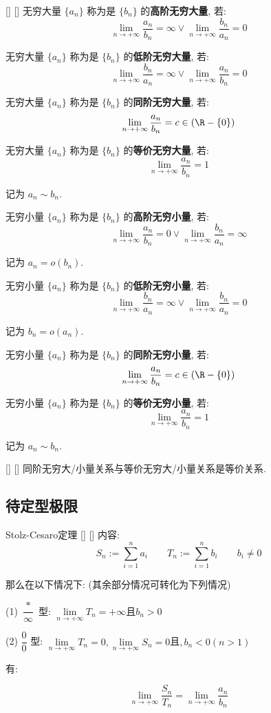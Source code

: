 \documentclass[UTF8]{ctexart}
\begin{document}
			\begin{dfn}
			    []
			    {}
			    []
			    []
				无穷大量 \(\{a_n\}\) 称为是 \(\{b_n\}\) 的\textbf{高阶无穷大量}, 若: 
				\[\lim_{n\to+\infty}\frac{a_n}{b_n}=\infty\vee\lim_{n\to+\infty}\frac{b_n}{a_n}=0\]
				
				无穷大量 \(\{a_n\}\) 称为是 \(\{b_n\}\) 的\textbf{低阶无穷大量}, 若: 
				\[\lim_{n\to+\infty}\frac{b_n}{a_n}=\infty\vee\lim_{n\to+\infty}\frac{a_n}{b_n}=0\]
			
				无穷大量 \(\{a_n\}\) 称为是 \(\{b_n\}\) 的\textbf{同阶无穷大量}, 若: 
				\[\lim_{n\to+\infty}\frac{a_n}{b_n}=c\in(\R-\{0\})\]
				
				无穷大量 \(\{a_n\}\) 称为是 \(\{b_n\}\) 的\textbf{等价无穷大量}, 若: \[\lim_{n\to+\infty}\frac{a_n}{b_n}=1\]
				
				记为 \(a_n\sim b_n\). 
								
				无穷小量 \(\{a_n\}\) 称为是 \(\{b_n\}\) 的\textbf{高阶无穷小量}, 若: 
				\[\lim_{n\to+\infty}\frac{a_n}{b_n}=0\vee\lim_{n\to+\infty}\frac{b_n}{a_n}=\infty\]
				
				记为 \(a_n=o(b_n)\). 
				
				无穷小量 \(\{a_n\}\) 称为是 \(\{b_n\}\) 的\textbf{低阶无穷小量}, 若: 
				\[\lim_{n\to+\infty}\frac{b_n}{a_n}=\infty\vee\lim_{n\to+\infty}\frac{b_n}{a_n}=0\]
				
				记为 \(b_n=o(a_n)\). 
			
				无穷小量 \(\{a_n\}\) 称为是 \(\{b_n\}\) 的\textbf{同阶无穷小量}, 若: 
				\[\lim_{n\to+\infty}\frac{a_n}{b_n}=c\in(\R-\{0\})\]
				
				无穷小量 \(\{a_n\}\) 称为是 \(\{b_n\}\) 的\textbf{等价无穷小量}, 若: 
				\[\lim_{n\to+\infty}\frac{a_n}{b_n}=1\]	
				
				记为 \(a_n\sim b_n\). 
				
			\end{dfn}
			
			\begin{ppt}
			    []
			    {}
			    []
			    []
				同阶无穷大/小量关系与等价无穷大/小量关系是等价关系. 
			\end{ppt}
		
		\subsection{待定型极限}
			
			\begin{thm}
			    []
			    {Stolz-Cesaro定理}
			    []
			    []
				内容: 
				\[S_n:=\sum_{i=1}^n a_i
				\qquad
				T_n:=\sum_{i=1}^n b_i
				\qquad
				b_i\neq 0\]
			
				那么在以下情况下: (其余部分情况可转化为下列情况)

				(1) \(\dfrac{*}{\infty}\) 型: 
				\(\lim\limits_{n\to+\infty}T_n=+\infty\)且\(b_n>0\)

				(2) \(\dfrac{0}{0}\) 型: 
				\(\lim\limits_{n\to+\infty}T_n=0,\lim\limits_{n\to+\infty}S_n=0\)且\(,b_n<0(n>1)\)
				
				有: 

				\[\lim_{n\to+\infty}\frac{S_n}{T_n}=\lim_{n\to+\infty}\frac{a_n}{b_n}\]
			\end{thm}
			
\end{document}
